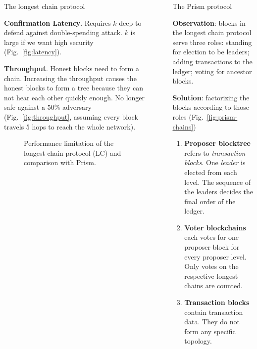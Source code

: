 \documentclass[final]{beamer}
\newlength{\sepwidth}
\newlength{\colwidth}
\newcommand{\separatorcolumn}{\begin{column}{\sepwidth}\end{column}}
\begin{document}
\begin{frame}[t]
\begin{columns}[t]
\begin{column}{\colwidth}
\begin{block}{The longest chain protocol}
    
  \textbf{Confirmation Latency}. Requires $k$-deep to defend against double-spending attack. $k$ is large if we want high security (Fig.~\ref{fig:latency}).
  
  \textbf{Throughput}. Honest blocks need to form a chain. Increasing the throughput causes the honest blocks to form a tree because they can not hear each other quickly enough. No longer safe against a 50\% adversary (Fig.~\ref{fig:throughput}, assuming every block travels 5 hops to reach the whole network).
  
  \begin{figure}
      \centering
      \caption{Performance limitation of the longest chain protocol (LC) and comparison with Prism.}
  \end{figure}
  \end{block}
  
\end{column}

\separatorcolumn

\begin{column}{\colwidth}

  
  \begin{alertblock}{The Prism protocol}

  \textbf{Observation}: blocks in the longest chain protocol serve three roles: standing for election to be leaders; adding transactions to the ledger; voting for ancestor blocks.
  
  \textbf{Solution}: factorizing the blocks according to those roles (Fig.~\ref{fig:prism-chains})
  
  \begin{enumerate}
      \item \textbf{Proposer blocktree} refers to \textit{transaction blocks}. One \textit{leader} is elected from each level. The sequence of the leaders decides the final order of the ledger.
      \item \textbf{Voter blockchains} each votes for one proposer block for every proposer level. Only votes on the respective longest chains are counted.  
      \item \textbf{Transaction blocks} contain transaction data. They do not form any specific topology.
  \end{enumerate}
  

\end{alertblock}
\end{column}
\end{columns}
\end{frame}
\end{document}
